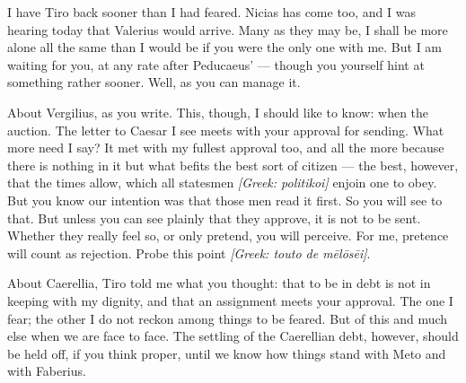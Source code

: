 

 I have Tiro back sooner than I had feared. Nicias has come too, and I was hearing today that Valerius would arrive. Many as they may be, I shall be more alone all the same than I would be if you were the only one with me. But I am waiting for you, at any rate after Peducaeus' --- though you yourself hint at something rather sooner. Well, as you can manage it.

 About Vergilius, as you write. This, though, I should like to know: when the auction. The letter to Caesar I see meets with your approval for sending. What more need I say? It met with my fullest approval too, and all the more because there is nothing in it but what befits the best sort of citizen --- the best, however, that the times allow, which all statesmen \textit{[Greek: politikoi]} enjoin one to obey. But you know our intention was that those men read it first. So you will see to that. But unless you can see plainly that they approve, it is not to be sent. Whether they really feel so, or only pretend, you will perceive. For me, pretence will count as rejection. Probe this point \textit{[Greek: touto de m\=el\=os\=ei]}.

 About Caerellia, Tiro told me what you thought: that to be in debt is not in keeping with my dignity, and that an assignment meets your approval. The one I fear; the other I do not reckon among things to be feared. But of this and much else when we are face to face. The settling of the Caerellian debt, however, should be held off, if you think proper, until we know how things stand with Meto and with Faberius.
